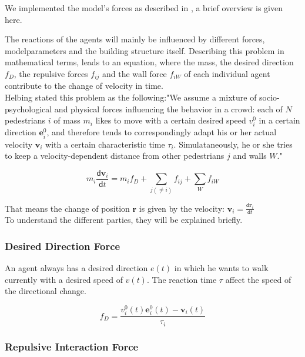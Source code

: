 \documentclass[11pt]{article}
\begin{document}
We implemented the model's forces as described in \cite{SDFEP}, a brief overview is given here.

The reactions of the agents will mainly be influenced by different forces, modelparameters and the building structure itself.
Describing this problem in mathematical terms, leads to an equation, where the mass, the desired direction $f_{D}$, the repulsive forces $f_{ij}$ and the wall force $f_{iW}$ of each individual agent contribute to the change of velocity in time.\\
Helbing stated this problem as the following:"We assume a mixture of socio-psychological and physical forces influencing the behavior in a crowd: each of $N$ pedestrians $i$ of mass $m_{i}$ likes to move with a certain desired speed $v_{i}^0$ in a certain direction $\mathbf{e}_{i}^0$, and therefore tends to correspondingly adapt his or her actual velocity $\mathbf{v}_i$ with a certain characteristic time $\tau_{i}$. Simulataneously, he or she tries to keep a velocity-dependent distance from other pedestrians $j$ and walls $W$."

\begin{equation}
m_{i}\frac{\mathsf{d}\mathbf{v}_{i}}{\mathsf{d}t}=m_{i}f_{D}+\sum \limits_{j(\neq{i})}{f_{ij}}+\sum \limits_{W}{f_{iW}}
\end{equation}

That means the change of position $\mathbf{r}$ is given by the velocity: $\mathbf{v}_{i}=\frac{\mathsf{d}\mathbf{r}_{i}}{\mathsf{d}t}$\\
To understand the different parties, they will be explained briefly.

\subsubsection{Desired Direction Force}

An agent always has a desired direction $e(t)$ in which he wants to walk currently with a desired speed of $v(t)$. 
The reaction time $\tau$ affect the speed of the directional change.

\begin{equation}
f_{D}=\frac{v_{i}^{0}(t)\mathbf{e}_{i}^{0}(t)-\mathbf{v}_{i}(t)}{\tau_{i}}
\end{equation}

\subsubsection{Repulsive Interaction Force}
\end{document}
